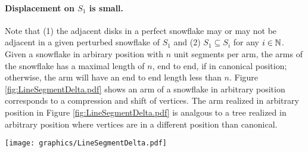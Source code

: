 
\paragraph{Displacement on $S_1$ is small.}
Note that (1) the adjacent disks in a perfect snowflake may or may not be adjacent in a given perturbed snowflake of $S_1$ and (2) $S_1 \subseteq S_i$ for any $i \in {\mathbb{N}}$.  
Given a snowflake in arbirary position with $n$ unit segments per arm, the arms of the snowflake has a maximal length of $n$, end to end, if in canonical position; otherwise, the arm will have an end to end length less than $n$.  
Figure \ref{fig:LineSegmentDelta.pdf} shows an arm of a snowflake in arbitrary position corresponds to a compression and shift of vertices.  
The arm realized in arbitrary position in Figure \ref{fig:LineSegmentDelta.pdf} is analgous to a tree realized in arbitrary position where vertices are in a different position than canonical.  


\begin{minipage}{\linewidth}
\begin{center}
\texttt{[image: graphics/LineSegmentDelta.pdf]}
\label{fig:LineSegmentDelta.pdf}
\end{center}
\end{minipage}

